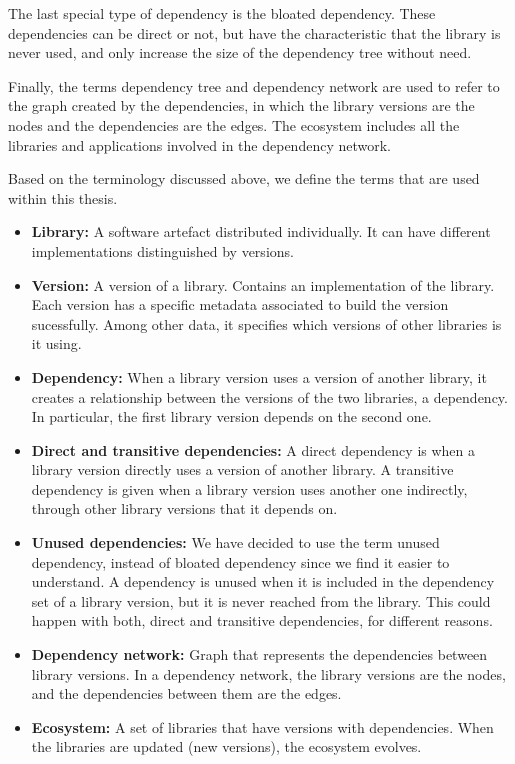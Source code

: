 The last special type of dependency is the bloated dependency. These dependencies can be direct or not, but have the characteristic that the library is never used, and only increase the size of the dependency tree without need.

Finally, the terms dependency tree and dependency network are used to refer to the graph created by the dependencies, in which the library versions are the nodes and the dependencies are the edges. The ecosystem includes all the libraries and applications involved in the dependency network.

\blankl
Based on the terminology discussed above, we define the terms that are used within this thesis.

\begin{itemize}
  \item \textbf{Library:} A software artefact distributed individually. It can have different implementations distinguished by versions.

  \item \textbf{Version:} A version of a library. Contains an implementation of the library. Each version has a specific metadata associated to build the version sucessfully. Among other data, it specifies which versions of other libraries is it using.

  \item \textbf{Dependency:} When a library version uses a version of another library, it creates a relationship between the versions of the two libraries, a dependency. In particular, the first library version depends on the second one.

  \item \textbf{Direct and transitive dependencies:} A direct dependency is when a library version directly uses a version of another library. A transitive dependency is given when a library version uses another one indirectly, through other library versions that it depends on.

  \item \textbf{Unused dependencies:} We have decided to use the term unused dependency, instead of bloated dependency since we find it easier to understand. A dependency is unused when it is included in the dependency set of a library version, but it is never reached from the library. This could happen with both, direct and transitive dependencies, for different reasons.

  \item \textbf{Dependency network:} Graph that represents the dependencies between library versions. In a dependency network, the library versions are the nodes, and the dependencies between them are the edges.

  \item \textbf{Ecosystem:} A set of libraries that have versions with dependencies. When the libraries are updated (new versions), the ecosystem evolves.
\end{itemize}

